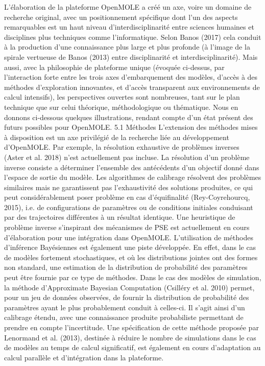 \documentclass[10pt]{article}
\begin{document}
L'élaboration de la plateforme OpenMOLE a créé un axe, voire un domaine de recherche original, avec un positionnement spécifique dont l’un des aspects remarquables est un haut niveau d'interdisciplinarité entre sciences humaines et disciplines plus techniques comme l’informatique. Selon Banos (2017) cela conduit à la production d’une connaissance plus large et plus profonde (à l’image de la spirale vertueuse de Banos (2013) entre disciplinarité et interdisciplinarité). Mais aussi, avec la philosophie de plateforme unique (évoquée ci-dessus, par l’interaction forte entre les trois axes d’embarquement des modèles, d'accès à des méthodes d’exploration innovantes, et d'accès transparent aux environnements de calcul intensifs), les perspectives ouvertes sont nombreuses, tant sur le plan technique que sur celui théorique, méthodologique ou thématique. Nous en donnons ci-dessous quelques illustrations, rendant compte d’un état présent des futurs possibles pour OpenMOLE.
5.1 Méthodes
L’extension des méthodes mises à disposition est un axe privilégié de la recherche liée au développement d’OpenMOLE. Par exemple, la résolution exhaustive de problèmes inverses (Aster et al. 2018) n’est actuellement pas incluse. La résolution d’un problème inverse consiste a déterminer l’ensemble des antécédents d’un objectif donné dans l’espace de sortie du modèle. Les algorithmes de calibrage résolvent des problèmes similaires mais ne garantissent pas l'exhaustivité des solutions produites, ce qui peut considérablement poser problème en cas d'équifinalité (Rey-Coyrehourcq, 2015), i.e. de configurations de paramètres ou de conditions initiales conduisant par des trajectoires différentes à un résultat identique. Une heuristique de problème inverse s’inspirant des mécanismes de PSE est actuellement en cours d'élaboration pour une intégration dans OpenMOLE.
L’utilisation de méthodes d'inférence Bayésiennes est également une piste développée. En effet, dans le cas de modèles fortement stochastiques, et où les distributions jointes ont des formes non standard, une estimation de la distribution de probabilité des paramètres peut être fournie par ce type de méthodes. Dans le cas des modèles de simulation, la méthode d’Approximate Bayesian Computation (Csilléry et al. 2010)  permet, pour un jeu de données observées, de fournir la distribution de probabilité des paramètres ayant le plus probablement conduit à celles-ci. Il s’agit ainsi d’un calibrage étendu, avec une connaissance produite probabiliste permettant de prendre en compte l’incertitude. Une spécification de cette méthode proposée par Lenormand et al. (2013), destinée à réduire le nombre de simulations dans le cas de modèles au temps de calcul significatif, est également en cours d’adaptation au calcul parallèle et d'intégration dans la plateforme.
\end{document}
